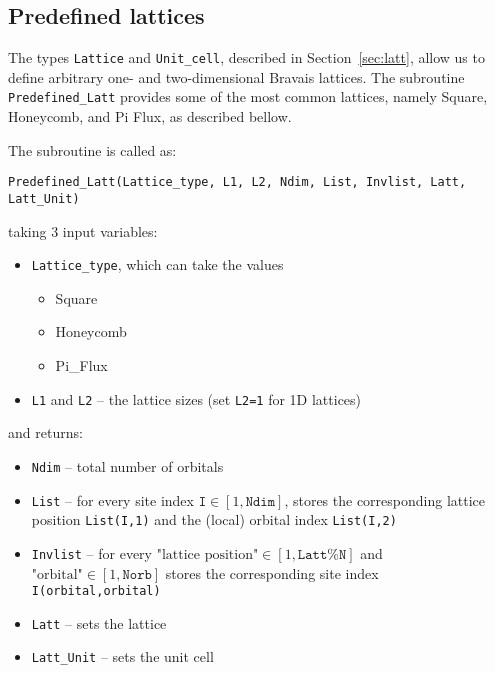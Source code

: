 %
\subsection{Predefined lattices} \label{sec:predefined_lattices}


The types \texttt{Lattice} and \texttt{Unit\_cell}, described in Section~\ref{sec:latt}, allow us to define arbitrary one- and two-dimensional Bravais lattices. The subroutine \texttt{Predefined\_Latt} provides some of the most common lattices, namely Square, Honeycomb, and Pi Flux, as described bellow.

The subroutine is called as:
\begin{lstlisting}[style=fortran]
Predefined_Latt(Lattice_type, L1, L2, Ndim, List, Invlist, Latt, Latt_Unit)
\end{lstlisting}
taking 3 input variables:
\begin{itemize}
	\item \texttt{Lattice\_type}, which can take the values
	\begin{itemize}
		\item Square
		\item Honeycomb
		\item Pi\_Flux
	\end{itemize}
	\item \texttt{L1} and \texttt{L2} -- the lattice sizes (set \texttt{L2=1} for 1D lattices)
\end{itemize}
and returns:
\begin{itemize}
	\item \texttt{Ndim} -- total number of orbitals
	\item \texttt{List} -- for every site index $\texttt{I} \in [1,\texttt{Ndim}]$, stores the corresponding lattice position \texttt{List(I,1)} and the (local) orbital index \texttt{List(I,2)}
	\item \texttt{Invlist} -- for every $\textrm{"lattice position"} \in [1,\texttt{Latt\%N}]$ and $\textrm{"orbital"} \in [1,\texttt{Norb}]$ stores the corresponding site index \texttt{I(\textrm{orbital},\textrm{orbital})}
	\item \texttt{Latt} -- sets the lattice
	\item \texttt{Latt\_Unit} -- sets the unit cell
\end{itemize}
